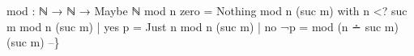 {\begin{code}
{mod : ℕ → ℕ → Maybe ℕ
mod n zero = Nothing
mod n (suc m) with n <? suc m
mod n (suc m) | yes p = Just n
mod n (suc m) | no ¬p = mod (n ∸ suc m) (suc m)
--\}}\<%
\\
%
\\[\AgdaEmptyExtraSkip]%
\>[0]\AgdaSpace{}%
\AgdaSymbol{:}\AgdaSpace{}%
\AgdaSymbol{(}\AgdaSpace{}%
\AgdaSpace{}%
\AgdaSymbol{:}\AgdaSpace{}%
\AgdaSymbol{)}\AgdaSpace{}%
\AgdaSpace{}%
\AgdaSpace{}%
\AgdaOperator{\AgdaFunction{\AgdaUnderscore{}<\AgdaUnderscore{}}}\AgdaSpace{}%
\AgdaSpace{}%
\AgdaSpace{}%
\AgdaSpace{}%
\<%
\\
\>[0]\AgdaSpace{}%
\AgdaSpace{}%
\AgdaSpace{}%
\AgdaSpace{}%
\AgdaSymbol{=}\AgdaSpace{}%
\<%
\\
\>[0]\AgdaSpace{}%
\AgdaSpace{}%
\AgdaSymbol{(}\AgdaSpace{}%
\AgdaSymbol{)}\AgdaSpace{}%
\AgdaSymbol{(}\AgdaSpace{}%
\AgdaSymbol{)}\AgdaSpace{}%
\AgdaSpace{}%
\AgdaSpace{}%
\AgdaSpace{}%
\AgdaSpace{}%
\<%
\\
\>[0]\AgdaSpace{}%
\AgdaSymbol{|}\AgdaSpace{}%
\AgdaSpace{}%
\AgdaSpace{}%
\AgdaSymbol{=}\AgdaSpace{}%
\AgdaSpace{}%
\<%
\\
\>[0]\AgdaSpace{}%
\AgdaSymbol{|}\AgdaSpace{}%
%
\>[10]\AgdaSpace{}%
\AgdaSymbol{=}\AgdaSpace{}%
\AgdaSpace{}%
\AgdaSymbol{(}\AgdaSpace{}%
\AgdaSpace{}%
\AgdaSpace{}%
\AgdaSymbol{)}\AgdaSpace{}%
\AgdaSymbol{(}\AgdaSpace{}%
\AgdaSymbol{)}\AgdaSpace{}%
\AgdaSymbol{(}\AgdaSpace{}%
\AgdaSymbol{(}\AgdaSpace{}%
\AgdaSpace{}%
\AgdaSpace{}%
\AgdaSymbol{)}\AgdaSpace{}%
\AgdaSymbol{(}\AgdaFunction{-<}\AgdaSpace{}%
\AgdaSymbol{))}\<%
\\
%
\\[\AgdaEmptyExtraSkip]%

\end{code}}

